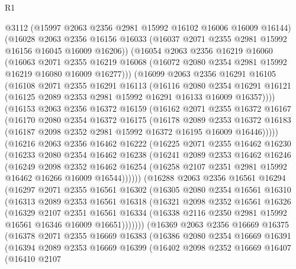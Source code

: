 \begin{lexlean}{R1}
\begin{coremodule}
    @3112
    (@15997 @2063 @2356 @2981 @15992 @16102 @16006 @16009 @16144)
    (@16028 @2063 @2356 @16156 @16033 (@16037 @2071 @2355 @2981 @15992 @16156 @16045 @16009 @16206))
    (@16054
      @2063
      @2356
      @16219
      @16060
      (@16063
        @2071
        @2355
        @16219
        @16068
        (@16072 @2080 @2354 @2981 @15992 @16219 @16080 @16009 @16277)))
    (@16099
      @2063
      @2356
      @16291
      @16105
      (@16108
        @2071
        @2355
        @16291
        @16113
        (@16116
          @2080
          @2354
          @16291
          @16121
          (@16125 @2089 @2353 @2981 @15992 @16291 @16133 @16009 @16357))))
    (@16153
      @2063
      @2356
      @16372
      @16159
      (@16162
        @2071
        @2355
        @16372
        @16167
        (@16170
          @2080
          @2354
          @16372
          @16175
          (@16178
            @2089
            @2353
            @16372
            @16183
            (@16187 @2098 @2352 @2981 @15992 @16372 @16195 @16009 @16446)))))
    (@16216
      @2063
      @2356
      @16462
      @16222
      (@16225
        @2071
        @2355
        @16462
        @16230
        (@16233
          @2080
          @2354
          @16462
          @16238
          (@16241
            @2089
            @2353
            @16462
            @16246
            (@16249
              @2098
              @2352
              @16462
              @16254
              (@16258 @2107 @2351 @2981 @15992 @16462 @16266 @16009 @16544))))))
    (@16288
      @2063
      @2356
      @16561
      @16294
      (@16297
        @2071
        @2355
        @16561
        @16302
        (@16305
          @2080
          @2354
          @16561
          @16310
          (@16313
            @2089
            @2353
            @16561
            @16318
            (@16321
              @2098
              @2352
              @16561
              @16326
              (@16329
                @2107
                @2351
                @16561
                @16334
                (@16338 @2116 @2350 @2981 @15992 @16561 @16346 @16009 @16651)))))))
    (@16369
      @2063
      @2356
      @16669
      @16375
      (@16378
        @2071
        @2355
        @16669
        @16383
        (@16386
          @2080
          @2354
          @16669
          @16391
          (@16394
            @2089
            @2353
            @16669
            @16399
            (@16402
              @2098
              @2352
              @16669
              @16407
              (@16410
                @2107

\end{coremodule}
\end{lexlean}
